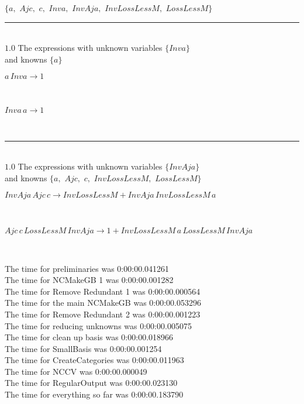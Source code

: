 \documentclass[rep10,leqno]{report}
\begin{document}
$\{a,
$ $
Ajc,
$ $
c,
$ $
Inva,
$ $
InvAja,
$ $
InvLossLessM,
$ $
LossLessM\}$
\smallskip\\
\rule[3pt]{6in}{.7pt}\\
$1.0$  The expressions with unknown variables $\{Inva\}$\\
and knowns $\{a\}$\smallskip\\
\begin{minipage}{6in}
$
a\,
 Inva\rightarrow 1
$
\end{minipage}\medskip \\
\begin{minipage}{6in}
$
Inva\,
 a\rightarrow 1
$
\end{minipage}\\
\rule[3pt]{6in}{.7pt}\\
$1.0$  The expressions with unknown variables $\{InvAja\}$\\
and knowns $\{a,
$ $
Ajc,
$ $
c,
$ $
InvLossLessM,
$ $
LossLessM\}$\smallskip\\
\begin{minipage}{6in}
$
InvAja\,
 Ajc\,
 c\rightarrow InvLossLessM + InvAja\,
 InvLossLessM\,
 a
$
\end{minipage}\medskip \\
\begin{minipage}{6in}
$
Ajc\,
 c\,
 LossLessM\,
 InvAja\rightarrow 1 + InvLossLessM\,
 a\,
 LossLessM\,
 InvAja
$
\end{minipage}\\
\vspace{10pt}

\noindent
The time for preliminaries was 0:00:00.041261\\
The time for NCMakeGB 1 was 0:00:00.001282\\
The time for Remove Redundant 1 was 0:00:00.000564\\
The time for the main NCMakeGB was 0:00:00.053296\\
The time for Remove Redundant 2 was 0:00:00.001223\\
The time for reducing unknowns was 0:00:00.005075\\
The time for clean up basis was 0:00:00.018966\\
The time for SmallBasis was 0:00:00.001254\\
The time for CreateCategories was 0:00:00.011963\\
The time for NCCV was 0:00:00.000049\\
The time for RegularOutput was 0:00:00.023130\\
The time for everything so far was 0:00:00.183790\\
\end{document}
